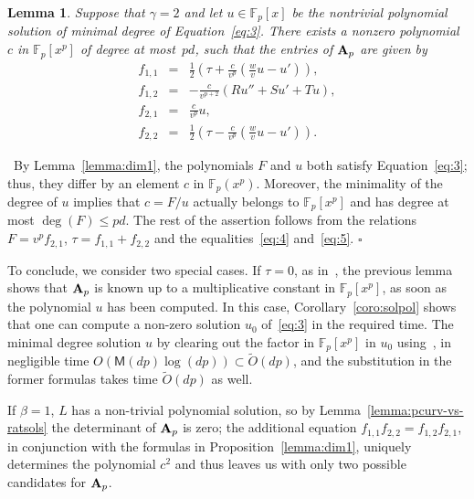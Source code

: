 \documentclass{sig-alternate}
\newcommand{\bigOsoft}{\tilde{O}}
\def\F {\mathbb{F}}
\def\M{\ensuremath{\mathsf{M}}}
\def\mA {\ensuremath{{\bf A}}}
\def\myproof{\noindent{\sc Proof.}~}
\def\foorp{\hfill$\square$}
\newtheorem{Lemma}{Lemma}
\begin{document}
\begin{Lemma}\label{lemma:dim2}
  Suppose that $\gamma=2$ and let $u \in \F_p[x]$ be the nontrivial
  polynomial solution of minimal degree of
  Equation~\eqref{eq:3}. There exists a nonzero polynomial $c$ in
  $\F_p[x^p]$ of degree at most~$pd$, such that the entries of $\mA_p$
  are given by
\begin{eqnarray*}
f_{1,1} &=& \frac12 \left( \tau + \frac{c}{v^p} \left(\frac{w}{v} u-u' \right) \right),\\ 
f_{1,2} &=& - \frac{c}{v^{p+2}} \left(R u'' + Su' + Tu \right),\\ 
f_{2,1} &=& \frac{c}{v^p} u,\\
f_{2,2} &=& \frac12 \left( \tau - \frac{c}{v^p} \left(\frac{w}{v} u-u' \right) \right).
\end{eqnarray*}
\end{Lemma}
\myproof By Lemma~\ref{lemma:dim1}, the polynomials $F$ and $u$ both
satisfy Equation~\eqref{eq:3}; thus, they differ by an element $c$ in
$\F_p(x^p)$. Moreover, the minimality of the degree of $u$ implies
that $c=F/u$ actually belongs to $\F_p[x^p]$ and has degree at most
$\deg(F) \leq pd$.  The rest of the assertion follows from the
relations $F=v^p f_{2,1}$, $\tau = f_{1,1} + f_{2,2}$ and the
equalities~\eqref{eq:4} and~\eqref{eq:5}. \foorp

\smallskip{}
To conclude, we consider two special cases. If $\tau=0$, as
in~\cite{vanDerPut96}, the previous lemma shows that $\mA_p$ is known
up to a multiplicative constant in $\F_p[x^p]$, as soon as the
polynomial $u$ has been computed. In this case,
Corollary~\ref{coro:solpol} shows that one can compute a non-zero
solution $u_0$ of~\eqref{eq:3} in the required time. The minimal
degree solution $u$ by clearing out the factor in $\F_p[x^p]$ in $u_0$
using~\cite[Ex.~14.27]{GaGe99}, in negligible time $O(\M(dp)\log(dp))
\subset \bigOsoft(dp)$, and the substitution in the former formulas
takes time $\bigOsoft(dp)$ as well.

If $\beta=1$, $L$ has a non-trivial polynomial solution, so by
Lemma~\ref{lemma:pcurv-vs-ratsols} the determinant of $\mA_p$ is zero;
the additional equation $f_{1,1} f_{2,2}=f_{1,2}f_{2,1}$, in
conjunction with the formulas in Proposition~\ref{lemma:dim1},
uniquely determines the polynomial $c^2$ and thus leaves us with only
two possible candidates for $\mA_p$.
\end{document}
